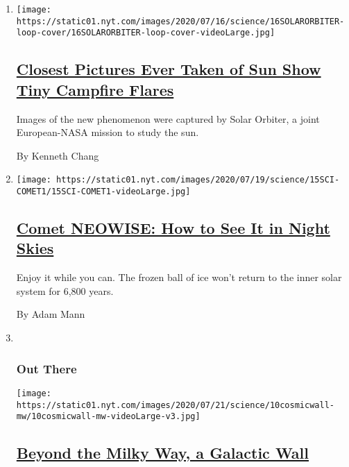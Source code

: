 \begin{enumerate}
\def\labelenumi{\arabic{enumi}.}
\item
  \texttt{[image: https://static01.nyt.com/images/2020/07/16/science/16SOLARORBITER-loop-cover/16SOLARORBITER-loop-cover-videoLarge.jpg]}

  \hypertarget{closest-pictures-ever-taken-of-sun-show-tiny-campfire-flares}{%
  \subsection{\texorpdfstring{\href{/2020/07/16/science/solar-orbiter-sun-images.html}{Closest
  Pictures Ever Taken of Sun Show Tiny Campfire
  Flares}}{Closest Pictures Ever Taken of Sun Show Tiny Campfire Flares}}\label{closest-pictures-ever-taken-of-sun-show-tiny-campfire-flares}}

  Images of the new phenomenon were captured by Solar Orbiter, a joint
  European-NASA mission to study the sun.

  By Kenneth Chang
\item
  \texttt{[image: https://static01.nyt.com/images/2020/07/19/science/15SCI-COMET1/15SCI-COMET1-videoLarge.jpg]}

  \hypertarget{comet-neowise-how-to-see-it-in-night-skies}{%
  \subsection{\texorpdfstring{\href{/article/neowise-comet.html}{Comet
  NEOWISE: How to See It in Night
  Skies}}{Comet NEOWISE: How to See It in Night Skies}}\label{comet-neowise-how-to-see-it-in-night-skies}}

  Enjoy it while you can. The frozen ball of ice won't return to the
  inner solar system for 6,800 years.

  By Adam Mann
\item ~
  \hypertarget{out-there-1}{%
  \subsubsection{Out There}\label{out-there-1}}

  \texttt{[image: https://static01.nyt.com/images/2020/07/21/science/10cosmicwall-mw/10cosmicwall-mw-videoLarge-v3.jpg]}

  \hypertarget{beyond-the-milky-way-a-galactic-wall}{%
  \subsection{\texorpdfstring{\href{/2020/07/10/science/astronomy-galaxies-attractor-universe.html}{Beyond
  the Milky Way, a Galactic
  Wall}}{Beyond the Milky Way, a Galactic Wall}}\label{beyond-the-milky-way-a-galactic-wall}}


\end{enumerate}
